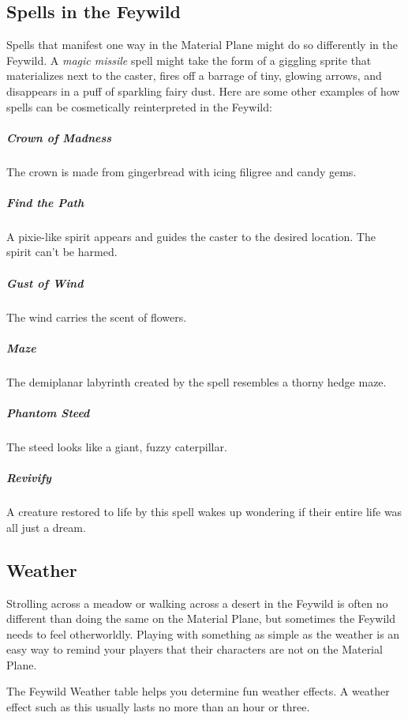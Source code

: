 \documentclass[10pt,a4paper,twoside,bg=print,twocolumn,openany,nodeprecatedcode]{dndbook}
\begin{document}
\subsection{Spells in the Feywild}
Spells that manifest one way in the Material Plane might do so differently in the Feywild. A \textit{magic missile} spell might take the form of a giggling sprite that materializes next to the caster, fires off a barrage of tiny, glowing arrows, and disappears in a puff of sparkling fairy dust. Here are some other examples of how spells can be cosmetically reinterpreted in the Feywild:

\subparagraph{Crown of Madness}
The crown is made from gingerbread with icing filigree and candy gems.

\subparagraph{Find the Path}
A pixie-like spirit appears and guides the caster to the desired location. The spirit can't be harmed.

\subparagraph{Gust of Wind}
The wind carries the scent of flowers.

\subparagraph{Maze}
The demiplanar labyrinth created by the spell resembles a thorny hedge maze.

\subparagraph{Phantom Steed}
The steed looks like a giant, fuzzy caterpillar.

\subparagraph{Revivify}
A creature restored to life by this spell wakes up wondering if their entire life was all just a dream.

\subsection{Weather}
Strolling across a meadow or walking across a desert in the Feywild is often no different than doing the same on the Material Plane, but sometimes the Feywild needs to feel otherworldly. Playing with something as simple as the weather is an easy way to remind your players that their characters are not on the Material Plane.

The Feywild Weather table helps you determine fun weather effects. A weather effect such as this usually lasts no more than an hour or three.
\end{document}
